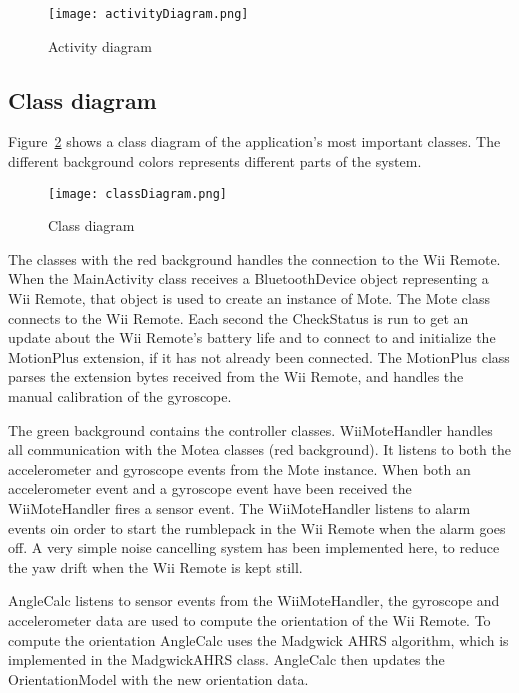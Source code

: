 \begin{figure}[h!]
  \centering
    \texttt{[image: activityDiagram.png]}
    \caption{\footnotesize Activity diagram}
    \label{fig:activityDiagram}
\end{figure}

\subsection{Class diagram}
Figure~\ref{fig:classDiagram} shows a class diagram of the application's most important classes. The different background colors represents different parts of the system.

\begin{figure}[h!]
	\centering
	\texttt{[image: classDiagram.png]}
	\caption{\footnotesize Class diagram}
	\label{fig:classDiagram}
\end{figure}

The classes with the red background handles the connection to the Wii Remote. When the MainActivity class receives a BluetoothDevice object representing a Wii Remote, that object is used to create an instance of Mote. The Mote class connects to the Wii Remote. Each second the CheckStatus is run to get an update about the Wii Remote's battery life and to connect to and initialize the MotionPlus extension, if it has not already been connected. The MotionPlus class parses the extension bytes received from the Wii Remote, and handles the manual calibration of the gyroscope.

The green background contains the controller classes. WiiMoteHandler handles all communication with the Motea classes (red background). It listens to both the accelerometer and gyroscope events from the Mote instance. When both an accelerometer event and a gyroscope event have been received the WiiMoteHandler fires a sensor event. The WiiMoteHandler listens to alarm events oin order to start the rumblepack in the Wii Remote when the alarm goes off.  A very simple noise cancelling system has been implemented here, to reduce the yaw drift when the Wii Remote is kept still.

AngleCalc listens to sensor events from the WiiMoteHandler, the gyroscope and accelerometer data are used to compute the orientation of the Wii Remote. To compute the orientation AngleCalc uses the Madgwick AHRS algorithm, which is implemented in the MadgwickAHRS class. AngleCalc then updates the OrientationModel with the new orientation data.

